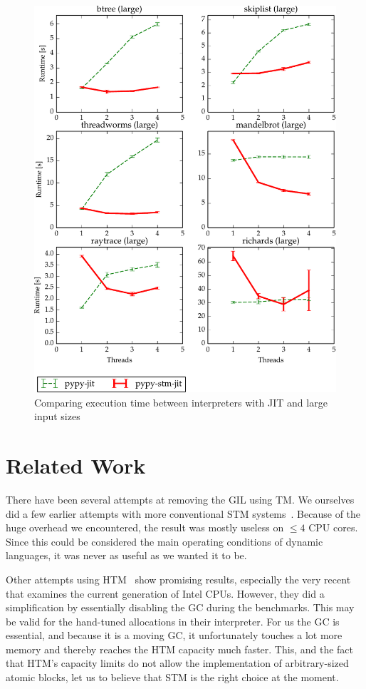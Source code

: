\documentclass{sigplanconf}
\begin{document}
\begin{figure}[h]
  \centering
  \includegraphics[width=1\columnwidth]{plots/performance.pdf}
  \caption{Comparing execution time between interpreters with JIT
    and large input sizes\label{fig:performance-jit}}
\end{figure}



\section{Related Work}

There have been several attempts at removing the GIL using TM. We
ourselves did a few earlier attempts with more conventional STM
systems~\cite{stmupdate13}. Because of the huge overhead we
encountered, the result was mostly useless on $\le 4$ CPU cores.
Since this could be considered the main operating conditions of
dynamic languages, it was never as useful as we wanted it to be.

Other attempts using HTM~\cite{nicholas06,odaira14,fuad10} show
promising results, especially the very recent~\cite{odaira14} that
examines the current generation of Intel CPUs. However, they did a
simplification by essentially disabling the GC during the
benchmarks. This may be valid for the hand-tuned allocations in their
interpreter. For us the GC is essential, and because it is a moving
GC, it unfortunately touches a lot more memory and thereby reaches the
HTM capacity much faster.  This, and the fact that HTM's capacity
limits do not allow the implementation of arbitrary-sized atomic blocks, let
us to believe that STM is the right choice at the moment.
\end{document}
